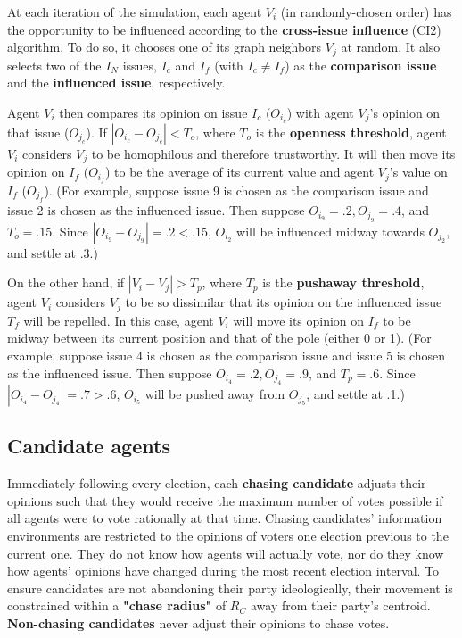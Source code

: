 At each iteration of the simulation, each agent $V_i$ (in randomly-chosen
order) has the opportunity to be influenced according to the
\textbf{cross-issue influence} (CI2) algorithm\cite{davies_agent-based_2023}.
To do so, it chooses one of its graph neighbors $V_j$ at random. It also
selects two of the $I_N$ issues, $I_c$ and $I_f$ (with $I_c \neq I_f$) as the
\textbf{comparison issue} and the \textbf{influenced issue}, respectively.

Agent $V_i$ then compares its opinion on issue $I_c$ ($O_{i_c}$) with agent
$V_j$'s opinion on that issue ($O_{j_c}$). If $|O_{i_c} - O_{j_c}| < T_o$,
where $T_o$ is the \textbf{openness threshold}, agent $V_i$ considers $V_j$ to
be homophilous and therefore trustworthy. It will then move its opinion on
$I_f$ ($O_{i_f}$) to be the average of its current value and agent $V_j$'s
value on $I_f$ ($O_{j_f}$). (For example, suppose issue 9 is chosen as the
comparison issue and issue 2 is chosen as the influenced issue. Then suppose
$O_{i_9} = .2, O_{j_9} = .4$, and $T_o = .15$. Since $|O_{i_9} - O_{j_9}| = .2
< .15$, $O_{i_2}$ will be influenced midway towards $O_{j_2}$, and settle at
.3.)

On the other hand, if $|V_i - V_j| > T_p$, where $T_p$ is the \textbf{pushaway
threshold}, agent $V_i$ considers $V_j$ to be so dissimilar that its opinion on
the influenced issue $T_f$ will be repelled. In this case, agent $V_i$ will
move its opinion on $I_f$ to be midway between its current position and that of
the pole (either 0 or 1). (For example, suppose issue 4 is chosen as the
comparison issue and issue 5 is chosen as the influenced issue. Then suppose
$O_{i_4} = .2, O_{j_4} = .9$, and $T_p = .6$. Since $|O_{i_4} - O_{j_4}| = .7
> .6$, $O_{i_5}$ will be pushed away from $O_{j_5}$, and settle at .1.)

\subsection{Candidate agents}


Immediately following every election, each \textbf{chasing candidate} 
adjusts their opinions such that they would receive the maximum number of votes 
possible if all agents were to vote rationally at that time. Chasing candidates' information environments are restricted to the opinions of voters one election previous to the current one. They do not know how agents will actually
vote, nor do they know how agents' opinions have changed during the most recent 
election interval. To ensure candidates are not abandoning their party ideologically, their movement is constrained within a \textbf{"chase radius"} of $R_C$ away from
their party's centroid. \textbf{Non-chasing candidates} never adjust their opinions 
to chase votes.


